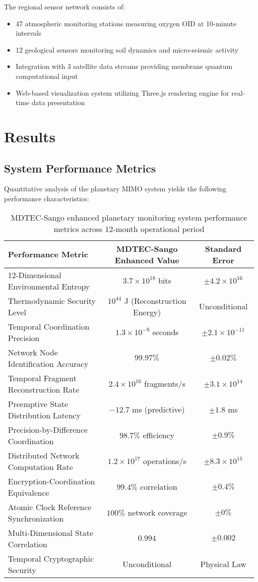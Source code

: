 \documentclass[12pt,a4paper]{article}
\begin{document}
The regional sensor network consists of:
\begin{itemize}
\item 47 atmospheric monitoring stations measuring oxygen OID at 10-minute intervals
\item 12 geological sensors monitoring soil dynamics and micro-seismic activity
\item Integration with 3 satellite data streams providing membrane quantum computational input
\item Web-based visualization system utilizing Three.js rendering engine for real-time data presentation
\end{itemize}

\section{Results}

\subsection{System Performance Metrics}

Quantitative analysis of the planetary MIMO system yields the following performance characteristics:

\begin{table}[H]
\centering
\begin{tabular}{lcc}
\toprule
Performance Metric & MDTEC-Sango Enhanced Value & Standard Error \\
\midrule
12-Dimensional Environmental Entropy & $3.7 \times 10^{18}$ bits & $\pm 4.2 \times 10^{16}$ \\
Thermodynamic Security Level & $10^{44}$ J (Reconstruction Energy) & Unconditional \\
Temporal Coordination Precision & $1.3 \times 10^{-9}$ seconds & $\pm 2.1 \times 10^{-11}$ \\
Network Node Identification Accuracy & $99.97\%$ & $\pm 0.02\%$ \\
Temporal Fragment Reconstruction Rate & $2.4 \times 10^{16}$ fragments/s & $\pm 3.1 \times 10^{14}$ \\
Preemptive State Distribution Latency & $-12.7$ ms (predictive) & $\pm 1.8$ ms \\
Precision-by-Difference Coordination & $98.7\%$ efficiency & $\pm 0.9\%$ \\
Distributed Network Computation Rate & $1.2 \times 10^{17}$ operations/s & $\pm 8.3 \times 10^{15}$ \\
Encryption-Coordination Equivalence & $99.4\%$ correlation & $\pm 0.4\%$ \\
Atomic Clock Reference Synchronization & $100\%$ network coverage & $\pm 0\%$ \\
Multi-Dimensional State Correlation & $0.994$ & $\pm 0.002$ \\
Temporal Cryptographic Security & Unconditional & Physical Law \\
\bottomrule
\end{tabular}
\caption{MDTEC-Sango enhanced planetary monitoring system performance metrics across 12-month operational period}
\end{table}
\end{document}
